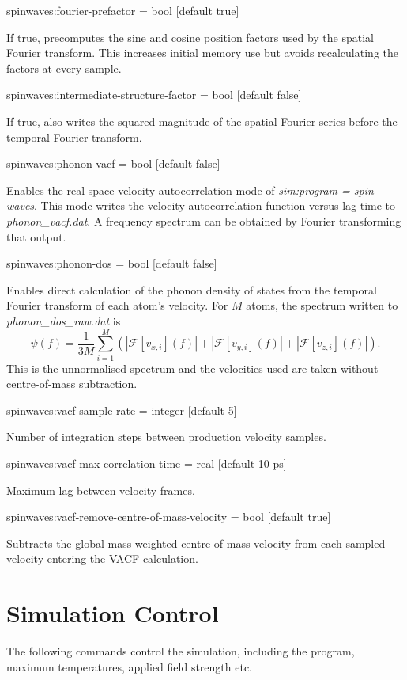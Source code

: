 {\zicf spinwaves:fourier-prefactor = bool [default true]}
If true, precomputes the sine and cosine position factors used by the spatial Fourier transform. 
This increases initial memory use but avoids recalculating the factors at every sample.

{\zicf spinwaves:intermediate-structure-factor = bool [default false]}
If true, also writes the squared magnitude of the spatial Fourier series before the temporal Fourier transform.

{\zicf spinwaves:phonon-vacf = bool [default false]}
Enables the real-space velocity autocorrelation mode of \textit{sim:program = spin-waves}. This mode writes the velocity autocorrelation function versus lag time to \textit{phonon\_vacf.dat}. A frequency spectrum can be obtained by Fourier transforming that output.

{\zicf spinwaves:phonon-dos = bool [default false]}
Enables direct calculation of the phonon density of states from the temporal Fourier transform of each atom's velocity. For $M$ atoms, the spectrum written to \textit{phonon\_dos\_raw.dat} is
\[
\psi(f)=\frac{1}{3M}\sum_{i=1}^{M}\left(
\left|\mathcal{F}[v_{x,i}](f)\right|+
\left|\mathcal{F}[v_{y,i}](f)\right|+
\left|\mathcal{F}[v_{z,i}](f)\right|\right).
\]
This is the unnormalised spectrum and the velocities used are taken without centre-of-mass subtraction.

{\zicf spinwaves:vacf-sample-rate = integer [default 5]}
Number of integration steps between production velocity samples.

{\zicf spinwaves:vacf-max-correlation-time = real [default 10 ps]}
Maximum lag between velocity frames.

{\zicf spinwaves:vacf-remove-centre-of-mass-velocity = bool [default true]}
Subtracts the global mass-weighted centre-of-mass velocity from each sampled velocity entering the VACF calculation.

\section*{Simulation Control}
The following commands control the simulation, including the program, maximum temperatures, applied field strength etc.

